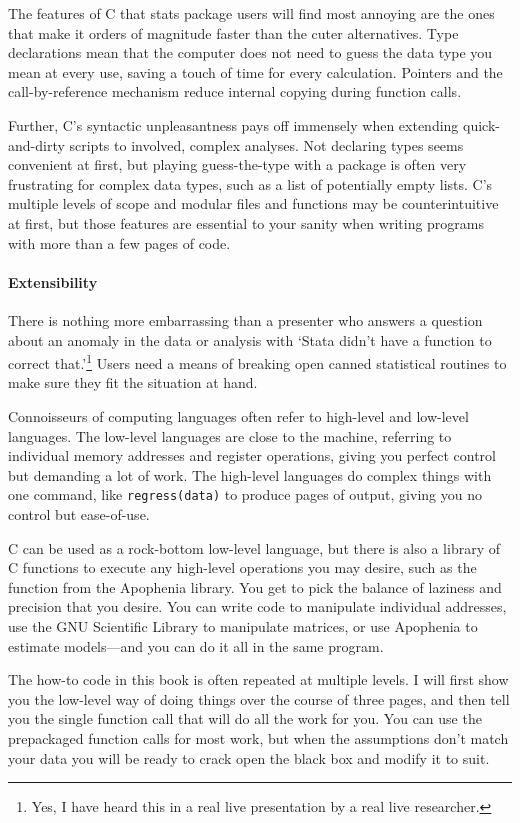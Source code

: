 The features of C that stats package users will find most annoying are
the ones that make it orders of magnitude faster than the cuter
alternatives.  Type declarations mean that the computer does not need
to guess the data type you mean at every use, saving a touch of time for
every calculation.  Pointers and the call-by-reference mechanism reduce
internal copying during function calls.

Further, C's syntactic unpleasantness pays off immensely when extending
quick-and-dirty scripts to involved, complex analyses.
Not declaring types seems convenient at first, but playing guess-the-type
with a package is often very frustrating for complex data types, such
as a list of potentially empty lists. C's multiple levels of scope and 
modular files and functions may be counterintuitive at first,
but those features are essential to your sanity when
writing programs with more than a few pages of code.

\paragraph{Extensibility}
There is nothing more embarrassing than a presenter who answers a question
about an anomaly in the data or analysis with `Stata didn't have a function to
correct that.'\footnote{Yes, I have heard this in a real live presentation
by a real live researcher.} Users need a means of breaking open canned
statistical routines to make sure they fit the situation at hand.

Connoisseurs of computing languages often refer to high-level and
low-level languages. The low-level languages are close to the machine,
referring to individual memory addresses and register operations,
giving you perfect control but demanding a lot of work. The high-level
languages do complex things with one command, like {\tt regress(data)}
to produce pages of output, giving you no control but ease-of-use.

C can be used as a rock-bottom low-level language, but there is also a
library of C functions to execute any high-level operations you may
desire, such as the  function from
the Apophenia library.  
You get to pick the balance of laziness and precision that you desire. You
can write code to manipulate individual addresses, use the GNU Scientific
Library to manipulate matrices, or use Apophenia to estimate models---and
you can do it all in the same program.

The how-to code in this book is often repeated at multiple levels. I
will first show you the low-level way of doing things over the course
of three pages, and then tell you the single function call that will do
all the work for you. You can use the prepackaged function calls for
most work, but when the assumptions don't match your data you will be
ready to crack open the black box and modify it to suit.


